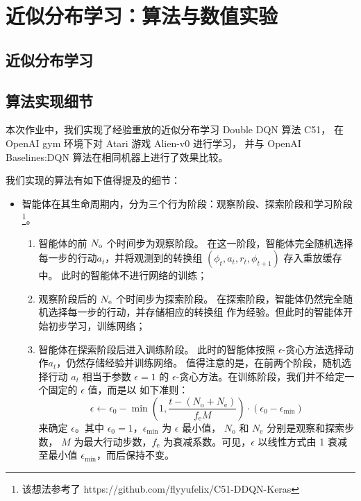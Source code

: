 \documentclass[UTF8]{ctexart}
\begin{document}
\section{近似分布学习：算法与数值实验}
\subsection{近似分布学习}
\subsection{算法实现细节}
本次作业中，我们实现了经验重放的近似分布学习 Double DQN 算法 C51，
在 OpenAI gym 环境下对 Atari 游戏 Alien-v0 进行学习，
并与 OpenAI Baselines:DQN 算法在相同机器上进行了效果比较。
\par
我们实现的算法有如下值得提及的细节：
\begin{itemize}
\item 智能体在其生命周期内，分为三个行为阶段：观察阶段、探索阶段和学习阶段
            \footnote{该想法参考了 https://github.com/flyyufelix/C51-DDQN-Keras}。
    \begin{enumerate}
        \item 智能体的前 $N_{\text o}$ 个时间步为观察阶段。
                在这一阶段，智能体完全随机选择每一步的行动$a_t$，并将观测到的转换组
                $(\phi_t,a_t,r_t,\phi_{t+1})$ 存入重放缓存中。
                此时的智能体不进行网络的训练；
        \item 观察阶段后的 $N_{\text e}$ 个时间步为探索阶段。
                在探索阶段，智能体仍然完全随机选择每一步的行动，并存储相应的转换组
                作为经验。但此时的智能体开始初步学习，训练网络；
        \item 智能体在探索阶段后进入训练阶段。
                此时的智能体按照 $\epsilon$-贪心方法选择动作$a_t$，仍然存储经验并训练网络。
                值得注意的是，在前两个阶段，随机选择行动 $a_t$ 相当于参数 $\epsilon=1$ 的
                $\epsilon$-贪心方法。在训练阶段，我们并不给定一个固定的 $\epsilon$ 值，而是以
                如下准则：
                \[
                    \epsilon \leftarrow \epsilon_0 - \min {\left(1, \frac{ t-(N_{\text{o}}+N_{\text{e}})}
                       {f_{\text{e}}M}\right) \cdot (\epsilon_0 - \epsilon_{\min})}
                \]
                来确定 $\epsilon$。其中 $\epsilon_0=1$，$\epsilon_{\min}$ 为 $\epsilon$ 最小值，
                $N_{\text{o}}$ 和 $N_{\text{e}}$ 分别是观察和探索步数，
                $M$ 为最大行动步数，$f_{\text{e}}$ 为衰减系数。可见，$\epsilon$ 以线性方式由
                1 衰减至最小值 $\epsilon_{\min}$，而后保持不变。 

\end{enumerate}
\end{itemize}
\end{document}
